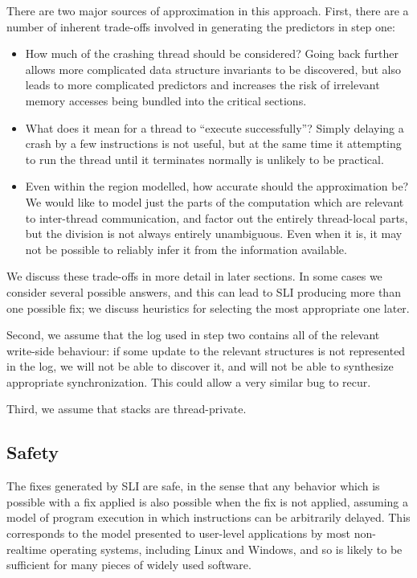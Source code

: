 There are two major sources of approximation in this approach.  First,
there are a number of inherent trade-offs involved in generating the
predictors in step one:

\begin{itemize}
\item How much of the crashing thread should be considered?  Going
  back further allows more complicated data structure invariants to be
  discovered, but also leads to more complicated predictors and
  increases the risk of irrelevant memory accesses being bundled into
  the critical sections.
\item What does it mean for a thread to ``execute successfully''?
  Simply delaying a crash by a few instructions is not useful, but at
  the same time it attempting to run the thread until it terminates
  normally is unlikely to be practical.
\item Even within the region modelled, how accurate should the
  approximation be?  We would like to model just the parts of the
  computation which are relevant to inter-thread communication, and
  factor out the entirely thread-local parts, but the division is not
  always entirely unambiguous.  Even when it is, it may not be
  possible to reliably infer it from the information available.
\end{itemize}

We discuss these trade-offs in more detail in later sections.  In some
cases we consider several possible answers, and this can lead to SLI
producing more than one possible fix; we discuss heuristics for
selecting the most appropriate one later.

Second, we assume that the log used in step two contains all of the
relevant write-side behaviour: if some update to the relevant
structures is not represented in the log, we will not be able to
discover it, and will not be able to synthesize appropriate
synchronization.  This could allow a very similar bug to recur.

Third, we assume that stacks are thread-private.

\subsection{Safety}

The fixes generated by SLI are safe, in the sense that any behavior
which is possible with a fix applied is also possible when the fix is
not applied, assuming a model of program execution in which
instructions can be arbitrarily delayed.  This corresponds to the
model presented to user-level applications by most non-realtime
operating systems, including Linux and Windows, and so is likely to be
sufficient for many pieces of widely used software.

